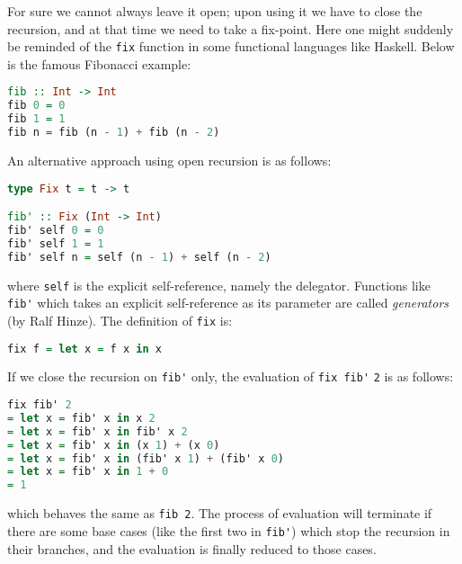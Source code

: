 For sure we cannot always leave it open; upon using it we have to close the recursion, and at that time we need to take a fix-point. Here one might suddenly be reminded of the \lstinline{fix} function in some functional languages like Haskell. Below is the famous Fibonacci example:
\begin{lstlisting}[language=Haskell,keywords={}]
fib :: Int -> Int
fib 0 = 0
fib 1 = 1
fib n = fib (n - 1) + fib (n - 2)
\end{lstlisting}
An alternative approach using open recursion is as follows:
\begin{lstlisting}[language=Haskell,keywords={type}]
type Fix t = t -> t

fib' :: Fix (Int -> Int)
fib' self 0 = 0
fib' self 1 = 1
fib' self n = self (n - 1) + self (n - 2)
\end{lstlisting}
where \lstinline{self} is the explicit self-reference, namely the delegator. Functions like \lstinline{fib'} which takes
an explicit self-reference as its parameter are called \textit{generators} (by Ralf Hinze). The definition of \lstinline{fix} is:
\begin{lstlisting}[language=Haskell,keywords={}]
fix f = let x = f x in x
\end{lstlisting}
If we close the recursion on \lstinline{fib'} only, the evaluation of \lstinline{fix fib'} \lstinline{2} is as follows:
\begin{lstlisting}[language=Haskell,keywords={}]
   fix fib' 2
= let x = fib' x in x 2
= let x = fib' x in fib' x 2
= let x = fib' x in (x 1) + (x 0)
= let x = fib' x in (fib' x 1) + (fib' x 0)
= let x = fib' x in 1 + 0
= 1
\end{lstlisting}
which behaves the same as \lstinline{fib 2}. The process of evaluation will terminate if there are some base cases (like the first two in
\lstinline{fib'}) which stop the recursion in their branches, and the evaluation is finally reduced to those cases.

